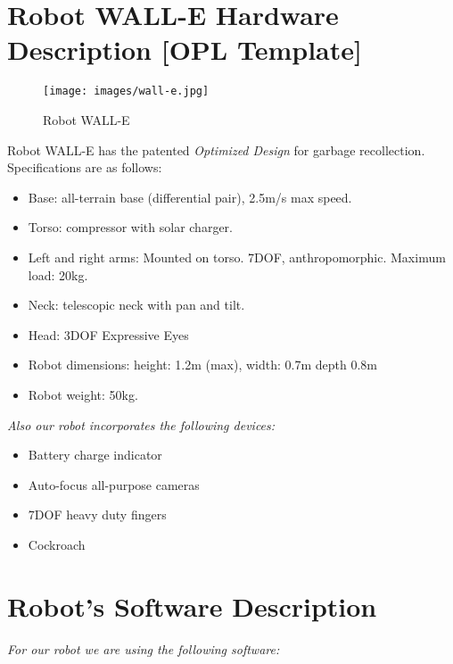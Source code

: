 \section*{Robot WALL-E Hardware Description [OPL Template]}
\label{sec:annex-OPL}

\setlength\intextsep{0pt}
\begin{wrapfigure}[10]{r}{0.3\textwidth}
	\centering
	\texttt{[image: images/wall-e.jpg]}
	\caption{Robot WALL-E}
	\label{fig:wall-e}
\end{wrapfigure}

Robot WALL-E has the patented \textit{\BnL Optimized Design} for garbage recollection. Specifications are as follows:

\begin{itemize}
	\item Base: \BnL all-terrain base (differential pair), 2.5m/s max speed.
	\item Torso: \BnL compressor with solar charger.
	\item Left and right arms: Mounted on torso. \BnL 7DOF, anthropomorphic. Maximum load: 20kg.
	\item Neck: \BnL telescopic neck with pan and tilt.
	\item Head: 3DOF \BnL Expressive Eyes
	\item Robot dimensions: height: 1.2m (max), width: 0.7m depth 0.8m
	\item Robot weight: 50kg.
\end{itemize}

\noindent\textit{Also our robot incorporates the following devices:}

\begin{itemize}
	\item \BnL Battery charge indicator
	\item \BnL Auto-focus all-purpose cameras
	\item \BnL 7DOF heavy duty fingers
	\item \BnL Cockroach
\end{itemize}

\section*{Robot's Software Description}

\textit{For our robot we are using the following software:}

